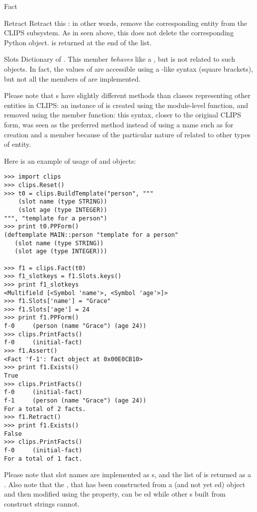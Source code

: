 \begin{classdesc*}{Fact}
\begin{methoddesc}{Retract}{}
Retract this : in other words, remove the corresponding
entity from the CLIPS subsystem. As in  seen above,
this does not delete the corresponding Python object.  is
returned at the end of the list.
\end{methoddesc}

\begin{memberdesc}[property]{Slots}
Dictionary of  . This member \emph{behaves} like
a , but is not related to such objects. In fact, the values
of  are accessible using a -like syntax (square
brackets), but not all the members of  are implemented.
\end{memberdesc}

Please note that s have slightly different methods than
classes representing other entities in CLIPS: an instance of 
is created using the module-level  function, and
removed using the  member function: this syntax,
closer to the original CLIPS form, was seen as the preferred method instead
of using a name such as  for creation and a
 member because of the particular nature of 
related to other types of entity.

Here is an example of usage of  and  objects:

\begin{verbatim}
>>> import clips
>>> clips.Reset()
>>> t0 = clips.BuildTemplate("person", """
    (slot name (type STRING))
    (slot age (type INTEGER))
""", "template for a person")
>>> print t0.PPForm()
(deftemplate MAIN::person "template for a person"
   (slot name (type STRING))
   (slot age (type INTEGER)))

>>> f1 = clips.Fact(t0)
>>> f1_slotkeys = f1.Slots.keys()
>>> print f1_slotkeys
<Multifield [<Symbol 'name'>, <Symbol 'age'>]>
>>> f1.Slots['name'] = "Grace"
>>> f1.Slots['age'] = 24
>>> print f1.PPForm()
f-0     (person (name "Grace") (age 24))
>>> clips.PrintFacts()
f-0     (initial-fact)
>>> f1.Assert()
<Fact 'f-1': fact object at 0x00E0CB10>
>>> print f1.Exists()
True
>>> clips.PrintFacts()
f-0     (initial-fact)
f-1     (person (name "Grace") (age 24))
For a total of 2 facts.
>>> f1.Retract()
>>> print f1.Exists()
False
>>> clips.PrintFacts()
f-0     (initial-fact)
For a total of 1 fact.
\end{verbatim}

Please note that slot names are implemented as s, and the
list of  is returned as a . Also note that
the  , that has been constructed from a
 (and not yet ed) object and then
modified using the  property, can be ed while
other s built from construct strings cannot.

\end{classdesc*}



